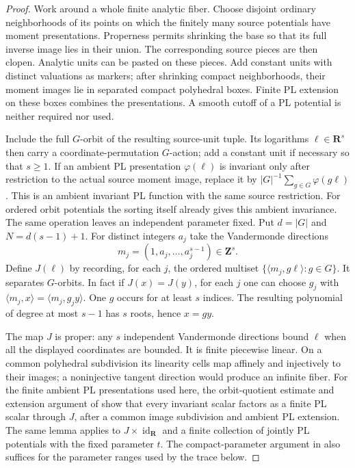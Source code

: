 \documentclass[11pt]{article}
\theoremstyle{definition}
\theoremstyle{remark}
\numberwithin{equation}{section}
\begin{document}
\begin{proof}
Work around a whole finite analytic fiber.  Choose disjoint ordinary
neighborhoods of its points on which the finitely many source potentials
have moment presentations.  Properness permits shrinking the base so
that its full inverse image lies in their union.  The corresponding
source pieces are then clopen.  Analytic units can be pasted on these
pieces.  Add constant units with distinct valuations as markers; after
shrinking compact neighborhoods, their moment images lie in separated
compact polyhedral boxes.  Finite PL extension on these boxes
combines the presentations.  A smooth cutoff of a PL potential is
neither required nor used.

Include the full $G$-orbit of the resulting source-unit tuple.  Its
logarithms $\ell\in\mathbf R^s$ then carry a coordinate-permutation
$G$-action; add a constant unit if necessary so that $s\geq1$.
If an ambient PL presentation $\varphi(\ell)$ is
invariant only after restriction to the actual source moment image,
replace it by $|G|^{-1}\sum_{g\in G}\varphi(g\ell)$.  This is an
ambient invariant PL function with the same source restriction.
For ordered orbit potentials the sorting itself already gives this
ambient invariance.  The same operation leaves an independent
parameter fixed.  Put $d=|G|$ and $N=d(s-1)+1$.  For distinct integers $a_j$
take the Vandermonde directions
\[
                     m_j=(1,a_j,\ldots,a_j^{s-1})\in\mathbf Z^s.
\]
Define $J(\ell)$ by recording, for each $j$, the ordered multiset
$\{\langle m_j,g\ell\rangle:g\in G\}$.  It separates $G$-orbits.
In fact if $J(x)=J(y)$, for each $j$ one can choose $g_j$ with
$\langle m_j,x\rangle=\langle m_j,g_jy\rangle$.  One $g$ occurs for
at least $s$ indices.  The resulting polynomial of degree at most $s-1$
has $s$ roots, hence $x=gy$.

The map $J$ is proper: any $s$ independent Vandermonde directions bound
$\ell$ when all the displayed coordinates are bounded.  It is finite
piecewise linear.  On a common polyhedral subdivision its linearity
cells map affinely and injectively to their images; a noninjective
tangent direction would produce an infinite fiber.  For the finite
ambient PL presentations used here, the orbit-quotient estimate and
extension argument of \cite[Lemma 4.2]{ChowGreenPairs} show that every
invariant scalar factors as a finite PL scalar through $J$, after a
common image subdivision and ambient PL extension.  The same lemma
applies to $J\times\operatorname{id}_{\mathbf R}$ and a finite
collection of jointly PL potentials with the fixed parameter $t$.
The compact-parameter argument in \cite[Section 5]{ChowGreenPairs}
also suffices for the parameter ranges used by the trace below.


\end{proof}
\end{document}
